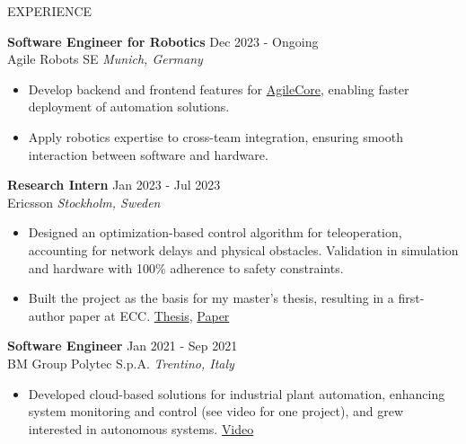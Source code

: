 \documentclass{resume} %
\begin{document}
\begin{rSection}{EXPERIENCE}


\textbf{Software Engineer for Robotics} \hfill Dec 2023 - Ongoing\\
Agile Robots SE \hfill \textit{Munich, Germany}
\begin{itemize}
    \itemsep -3pt {} 
    \item Develop backend and frontend features for \href{https://www.agile-robots.com/en/solutions/agilecore/}{AgileCore}, enabling faster deployment of automation solutions.
    \item Apply robotics expertise to cross-team integration, ensuring smooth interaction between software and hardware.
\end{itemize}

\textbf{Research Intern} \hfill Jan 2023 - Jul 2023\\
Ericsson \hfill \textit{Stockholm, Sweden}
\begin{itemize}
    \itemsep -3pt {} 
    \item Designed an optimization-based control algorithm for teleoperation, accounting for network delays and physical obstacles. Validation in simulation and hardware with 100\% adherence to safety constraints.
    \item Built the project as the basis for my master’s thesis, resulting in a first-author paper at ECC. \href{https://kth.diva-portal.org/smash/record.jsf?pid=diva2%3A1846846&dswid=1211}{Thesis}, \href{https://ieeexplore.ieee.org/document/10590767}{Paper}
\end{itemize}

\textbf{Software Engineer} \hfill Jan 2021 - Sep 2021\\
BM Group Polytec S.p.A. \hfill \textit{Trentino, Italy}
\begin{itemize}
    \itemsep -3pt {} 
    \item Developed cloud-based solutions for industrial plant automation, enhancing system monitoring and control (see video for one project), and grew interested in autonomous systems. \href{https://youtu.be/XaXRUYPYLRw}{Video}
\end{itemize}


\end{rSection}
\end{document}

